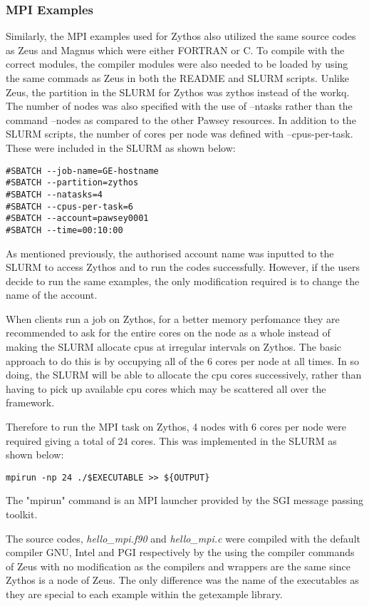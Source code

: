 \subsubsection{MPI Examples}

Similarly, the MPI examples used for Zythos also utilized the same source codes as Zeus and Magnus which were either FORTRAN or C. To compile with the
correct modules, the compiler modules were also needed to be loaded by using the same commads as Zeus in both the README and SLURM scripts. Unlike Zeus, 
the partition in the SLURM for Zythos was zythos instead of the workq. The number of nodes was also specified with the use of --ntasks rather than the 
command --nodes as compared to the other Pawsey resources. In addition to the SLURM scripts, the number of cores per node was defined with 
--cpus-per-task. These were included in the SLURM as shown below:

\begin{tcolorbox}
\begin{Verbatim}[fontsize=\scriptsize]
#SBATCH --job-name=GE-hostname
#SBATCH --partition=zythos
#SBATCH --natasks=4
#SBATCH --cpus-per-task=6
#SBATCH --account=pawsey0001
#SBATCH --time=00:10:00
\end{Verbatim}
\end{tcolorbox}

As mentioned previously, the authorised account name was inputted to the SLURM to access Zythos and to run the codes successfully. However, if the
users decide to run the same examples, the only modification required is to change the name of the account.

When clients run a job on Zythos, for a better memory perfomance they are recommended to ask for the entire cores on the node as a whole instead of 
making the SLURM allocate cpus at irregular intervals on Zythos. The basic approach to do this is by occupying all of the 6 cores per node at all times.
In so doing, the SLURM will be able to allocate the cpu cores successively, rather than having to pick up available cpu cores which may be scattered all 
over the framework. 

Therefore to run the MPI task on Zythos, 4 nodes with 6 cores per node were required giving a total of 24 cores. This was implemented 
in the SLURM as shown below:

\begin{tcolorbox}
\begin{Verbatim}[fontsize=\scriptsize]
mpirun -np 24 ./$EXECUTABLE >> ${OUTPUT}
\end{Verbatim}
\end{tcolorbox}

The "mpirun" command is an MPI launcher provided by the SGI message passing toolkit.

The source codes, \emph{hello\_mpi.f90} and \emph{hello\_mpi.c} were compiled with the default compiler GNU, Intel and PGI respectively by the using the 
compiler commands of Zeus with no modification as the compilers and wrappers are the same since Zythos is a node of Zeus. The only difference was the 
name of the executables as they are special to each example within the getexample library.
